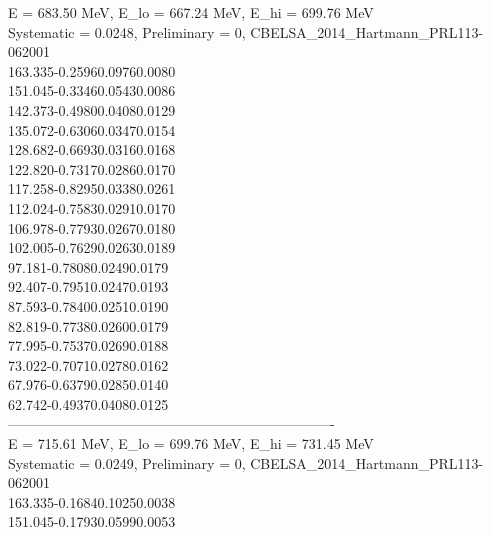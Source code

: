 \documentclass[a4paper,10pt]{article}
\def\bl{\phantom{0}}
\def\tt{\ttfamily}
\begin{document}
\tt
E =  683.50 MeV, E\_lo =  667.24 MeV, E\_hi =  699.76 MeV\\
Systematic = 0.0248, Preliminary = 0, CBELSA\_2014\_Hartmann\_PRL113-062001\\
163.335\bl\bl\bl -0.2596\bl\bl\bl 0.0976\bl\bl\bl 0.0080\\
151.045\bl\bl\bl -0.3346\bl\bl\bl 0.0543\bl\bl\bl 0.0086\\
142.373\bl\bl\bl -0.4980\bl\bl\bl 0.0408\bl\bl\bl 0.0129\\
135.072\bl\bl\bl -0.6306\bl\bl\bl 0.0347\bl\bl\bl 0.0154\\
128.682\bl\bl\bl -0.6693\bl\bl\bl 0.0316\bl\bl\bl 0.0168\\
122.820\bl\bl\bl -0.7317\bl\bl\bl 0.0286\bl\bl\bl 0.0170\\
117.258\bl\bl\bl -0.8295\bl\bl\bl 0.0338\bl\bl\bl 0.0261\\
112.024\bl\bl\bl -0.7583\bl\bl\bl 0.0291\bl\bl\bl 0.0170\\
106.978\bl\bl\bl -0.7793\bl\bl\bl 0.0267\bl\bl\bl 0.0180\\
102.005\bl\bl\bl -0.7629\bl\bl\bl 0.0263\bl\bl\bl 0.0189\\
\phantom{1}97.181\bl\bl\bl -0.7808\bl\bl\bl 0.0249\bl\bl\bl 0.0179\\
\phantom{1}92.407\bl\bl\bl -0.7951\bl\bl\bl 0.0247\bl\bl\bl 0.0193\\
\phantom{1}87.593\bl\bl\bl -0.7840\bl\bl\bl 0.0251\bl\bl\bl 0.0190\\
\phantom{1}82.819\bl\bl\bl -0.7738\bl\bl\bl 0.0260\bl\bl\bl 0.0179\\
\phantom{1}77.995\bl\bl\bl -0.7537\bl\bl\bl 0.0269\bl\bl\bl 0.0188\\
\phantom{1}73.022\bl\bl\bl -0.7071\bl\bl\bl 0.0278\bl\bl\bl 0.0162\\
\phantom{1}67.976\bl\bl\bl -0.6379\bl\bl\bl 0.0285\bl\bl\bl 0.0140\\
\phantom{1}62.742\bl\bl\bl -0.4937\bl\bl\bl 0.0408\bl\bl\bl 0.0125\\
----------------------------------------------------------------------\\
E =  715.61 MeV, E\_lo =  699.76 MeV, E\_hi =  731.45 MeV\\
Systematic = 0.0249, Preliminary = 0, CBELSA\_2014\_Hartmann\_PRL113-062001\\
163.335\bl\bl\bl -0.1684\bl\bl\bl 0.1025\bl\bl\bl 0.0038\\
151.045\bl\bl\bl -0.1793\bl\bl\bl 0.0599\bl\bl\bl 0.0053\\
\end{document}
